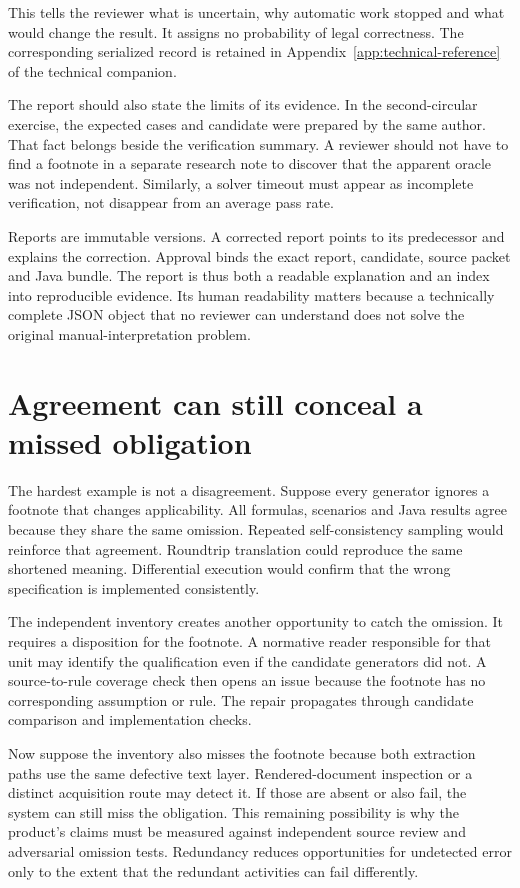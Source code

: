 This tells the reviewer what is uncertain, why automatic work stopped and what
would change the result. It assigns no probability of legal correctness.
The corresponding serialized record is retained in
Appendix~\ref{app:technical-reference} of the technical companion.


The report should also state the limits of its evidence. In the second-circular
exercise, the expected cases and candidate were prepared by the same author.
That fact belongs beside the verification summary. A reviewer should not have to
find a footnote in a separate research note to discover that the apparent oracle
was not independent. Similarly, a solver timeout must appear as incomplete
verification, not disappear from an average pass rate.

Reports are immutable versions. A corrected report points to its predecessor and
explains the correction. Approval binds the exact report, candidate, source
packet and Java bundle. The report is thus both a readable explanation and an
index into reproducible evidence. Its human readability matters because a
technically complete JSON object that no reviewer can understand does not solve
the original manual-interpretation problem.

\section{Agreement can still conceal a missed obligation}
\label{merge:M06:23}


The hardest example is not a disagreement. Suppose every generator ignores a
footnote that changes applicability. All formulas, scenarios and Java results
agree because they share the same omission. Repeated self-consistency sampling
would reinforce that agreement. Roundtrip translation could reproduce the same
shortened meaning. Differential execution would confirm that the wrong
specification is implemented consistently.

The independent inventory creates another opportunity to catch the omission. It
requires a disposition for the footnote. A normative reader responsible for that
unit may identify the qualification even if the candidate generators did not.
A source-to-rule coverage check then opens an issue because the footnote has no
corresponding assumption or rule. The repair propagates through candidate
comparison and implementation checks.


Now suppose the inventory also misses the footnote because both extraction paths
use the same defective text layer. Rendered-document inspection or a distinct
acquisition route may detect it. If those are absent or also fail, the system can
still miss the obligation. This remaining possibility is why the product's
claims must be measured against independent source review and adversarial
omission tests. Redundancy reduces opportunities for undetected error only to
the extent that the redundant activities can fail differently.

